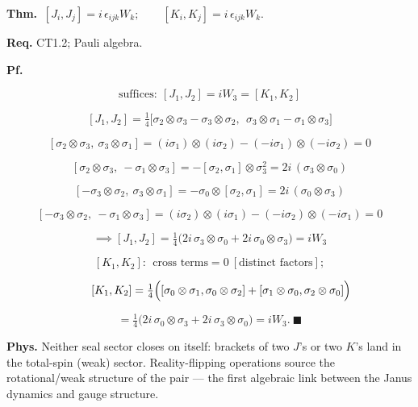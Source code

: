 \begin{theorem}\label{tag:CT1-6}
\textbf{Thm.} $\ [J_i,J_j]=i\,\epsilon_{ijk}W_k;\qquad[K_i,K_j]=i\,\epsilon_{ijk}W_k.$

\textbf{Req.} CT1.2; Pauli algebra.

\textbf{Pf.}

\[
\text{suffices}:\ [J_1,J_2]=iW_3=[K_1,K_2]
\]

\[
[J_1,J_2]=\tfrac14\bigl[\sigma_2\otimes\sigma_3-\sigma_3\otimes\sigma_2,\ \ \sigma_3\otimes\sigma_1-\sigma_1\otimes\sigma_3\bigr]
\]

\[
[\sigma_2\otimes\sigma_3,\ \sigma_3\otimes\sigma_1]=(i\sigma_1)\otimes(i\sigma_2)-(-i\sigma_1)\otimes(-i\sigma_2)=0
\]

\[
[\sigma_2\otimes\sigma_3,\ -\sigma_1\otimes\sigma_3]=-[\sigma_2,\sigma_1]\otimes\sigma_3^2=2i\,(\sigma_3\otimes\sigma_0)
\]

\[
[-\sigma_3\otimes\sigma_2,\ \sigma_3\otimes\sigma_1]=-\sigma_0\otimes[\sigma_2,\sigma_1]=2i\,(\sigma_0\otimes\sigma_3)
\]

\[
[-\sigma_3\otimes\sigma_2,\ -\sigma_1\otimes\sigma_3]=(i\sigma_2)\otimes(i\sigma_1)-(-i\sigma_2)\otimes(-i\sigma_1)=0
\]

\[
\implies[J_1,J_2]=\tfrac14\bigl(2i\,\sigma_3\otimes\sigma_0+2i\,\sigma_0\otimes\sigma_3\bigr)=iW_3
\]

\[
[K_1,K_2]:\ \ \text{cross terms}=0\ [\text{distinct factors}];
\]

\[
\qquad [K_1,K_2]=\tfrac14\Bigl([\sigma_0\otimes\sigma_1,\sigma_0\otimes\sigma_2]+[\sigma_1\otimes\sigma_0,\sigma_2\otimes\sigma_0]\Bigr)
\]

\[
=\tfrac14\bigl(2i\,\sigma_0\otimes\sigma_3+2i\,\sigma_3\otimes\sigma_0\bigr)=iW_3.\ \blacksquare
\]

\textbf{Phys.} Neither seal sector closes on itself: brackets of two $J$’s or two $K$’s land in the total-spin (weak) sector. Reality-flipping operations source the rotational/weak structure of the pair — the first algebraic link between the Janus dynamics and gauge structure.

\end{theorem}

